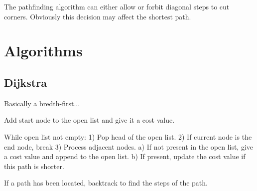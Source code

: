 \documentclass[12pt, a4paper]{article}
\begin{document}






The pathfinding algorithm can either allow or forbit diagonal steps to cut
corners. Obviously this decision may affect the shortest path. \cite{astar2}



\section{Algorithms}
\label{Algorithms}


\subsection{Dijkstra}


Basically a bredth-first...

Add start node to the open list and give it a cost value.

While open list not empty:
1) Pop head of the open list.
2) If current node is the end node, break
3) Process adjacent nodes.
	a) If not present in the open list, give a cost value and append to the open
	list.
	b) If present, update the cost value if this path is shorter.

If a path has been located, backtrack to find the steps of the path.


\end{document}
